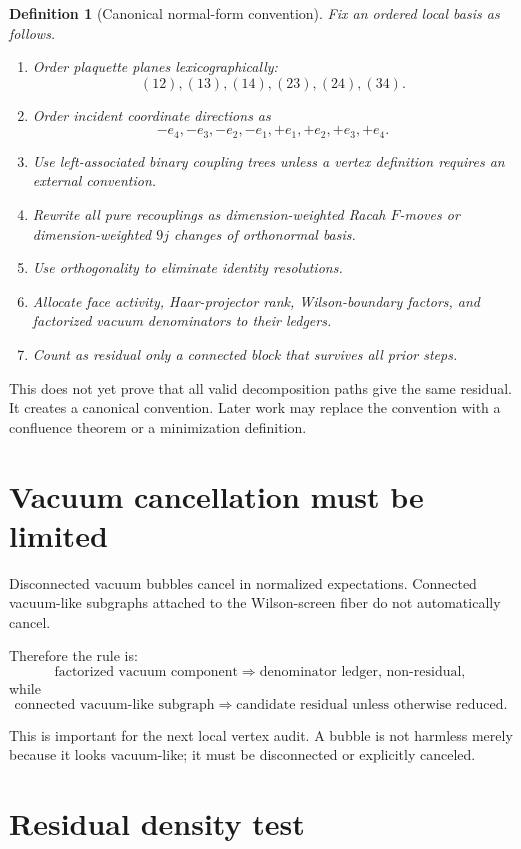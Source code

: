 \documentclass[11pt]{article}
\newtheorem{definition}{Definition}
\begin{document}
\begin{definition}[Canonical normal-form convention]
Fix an ordered local basis as follows.
\begin{enumerate}[leftmargin=1.1cm]
  \item Order plaquette planes lexicographically:
  \[
    (12),(13),(14),(23),(24),(34).
  \]
  \item Order incident coordinate directions as
  \[
    -e_4,-e_3,-e_2,-e_1,+e_1,+e_2,+e_3,+e_4.
  \]
  \item Use left-associated binary coupling trees unless a vertex definition requires an external convention.
  \item Rewrite all pure recouplings as dimension-weighted Racah $F$-moves or dimension-weighted $9j$ changes of orthonormal basis.
  \item Use orthogonality to eliminate identity resolutions.
  \item Allocate face activity, Haar-projector rank, Wilson-boundary factors, and factorized vacuum denominators to their ledgers.
  \item Count as residual only a connected block that survives all prior steps.
\end{enumerate}
\end{definition}

This does not yet prove that all valid decomposition paths give the same residual. It creates a canonical convention. Later work may replace the convention with a confluence theorem or a minimization definition.

\section{Vacuum cancellation must be limited}

Disconnected vacuum bubbles cancel in normalized expectations. Connected vacuum-like subgraphs attached to the Wilson-screen fiber do not automatically cancel.

Therefore the rule is:
\[
  \text{factorized vacuum component}\Rightarrow\text{denominator ledger, non-residual},
\]
while
\[
  \text{connected vacuum-like subgraph}\Rightarrow\text{candidate residual unless otherwise reduced}.
\]

This is important for the next local vertex audit. A bubble is not harmless merely because it looks vacuum-like; it must be disconnected or explicitly canceled.

\section{Residual density test}
\end{document}
